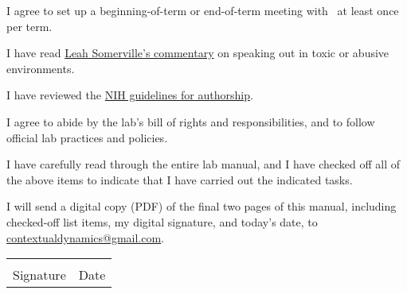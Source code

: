 \documentclass{tufte-book} %
\begin{document}
\begin{todolist}
  \item I agree to set up a beginning-of-term or end-of-term meeting
    with \director~at least once per term.
  \item I have read \href{https://www.sciencemag.org/careers/2018/11/what-can-we-learn-dartmouth}{Leah Somerville's commentary} on speaking
    out in toxic or abusive environments.
  \item I have reviewed the
    \href{https://oir.nih.gov/sites/default/files/uploads/sourcebook/documents/ethical_conduct/guidelines-authorship_contributions.pdf}{NIH
      guidelines for authorship}.
  \item I agree to abide by the lab's bill of rights and
    responsibilities, and to follow official lab practices and
    policies.
  \item I have carefully read through the entire lab manual, and I have
    checked off all of the above items to indicate that I have carried
    out the indicated tasks.
  \item I will send a digital copy (PDF) of the final two pages of
    this manual, including checked-off list items, my digital
    signature, and today's date, to \href{mailto:contextualdynamics@gmail.com}{contextualdynamics@gmail.com}.
\end{todolist}

\vspace{1in}
\begin{tabular}{@{}p{3in}p{1in}@{}}
\hrulefill & \hrulefill \\
Signature & Date\\
\end{tabular}





\end{document}
